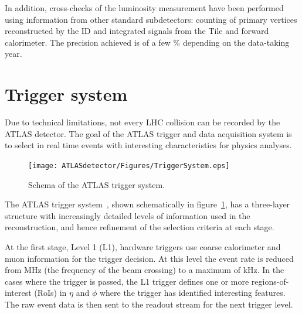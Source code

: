 In addition, cross-checks of the luminosity measurement have been performed using information from other standard subdetectors:
counting of primary vertices reconstructed by the ID and integrated signals from the Tile and forward calorimeter.
The precision achieved is of a few \% depending on the data-taking year.
\section{Trigger system}
    \label{sec:TriggerSystem}

    Due to technical limitations, not every LHC collision can be recorded by the ATLAS detector.
    The goal of the ATLAS trigger and data acquisition system is to select in real time events with interesting characteristics for physics analyses.

\begin{figure}[!tb]
  \begin{center}
      \texttt{[image: ATLASdetector/Figures/TriggerSystem.eps]}
  \end{center}
  \caption[Schema of the ATLAS trigger system.]{Schema of the ATLAS trigger system.}
  \label{fig:TriggerSchema}
\end{figure}

The ATLAS trigger system~\cite{Aad:2012xs}, shown schematically in figure~\ref{fig:TriggerSchema}, has a three-layer structure with increasingly detailed levels of information used in the reconstruction, and hence refinement of the selection criteria at each stage.


At the first stage, Level 1 (L1), hardware triggers use coarse calorimeter and muon information for the trigger decision.
At this level the event rate is reduced from \unit[40]{MHz} (the frequency of the beam crossing) to a maximum of \unit[75]{kHz}.
In the cases where the trigger is passed, the L1 trigger defines one or more regions-of-interest (RoIs) in $\eta$ and $\phi$ where the trigger has identified interesting features. The raw event data is then sent to the readout stream for the next trigger level.

